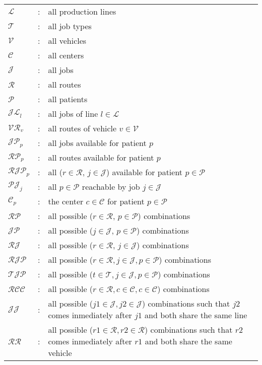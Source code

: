 \begin{tabular}{p{15mm}lp{105mm}}
    $\mathcal{L}$    & : & all production lines \\
    $\mathcal{T}$    & : & all job types \\                    
    $\mathcal{V}$    & : & all vehicles \\    
    $\mathcal{C}$    & : & all centers \\    
    $\mathcal{J}$    & : & all jobs \\    
    $\mathcal{R}$    & : & all routes \\    
    $\mathcal{P}$    & : & all patients \\
		$\mathcal{JL}_{l}$    & : & all jobs of line $l \in \mathcal{L}$ \\
		$\mathcal{VR}_{v}$    & : & all routes of vehicle $v \in \mathcal{V}$ \\
		$\mathcal{JP}_{p}$    & : & all jobs available for patient $p$ \\
		$\mathcal{RP}_p$    & : & all routes available for patient $p$ \\
		$\mathcal{RJP}_p$    & : & all ($r \in \mathcal{R}$, $j \in \mathcal{J}$) available for patient $p \in \mathcal{P}$ \\
		$\mathcal{PJ}_j$    & : & all $p \in \mathcal{P}$ reachable by job $j \in \mathcal{J}$ \\
		$\mathcal{C}_p$    & : & the center $c \in \mathcal{C}$ for patient $p \in \mathcal{P}$ \\
		$\mathcal{RP}$    & : & all possible ($r \in \mathcal{R}$, $p \in \mathcal{P}$) combinations \\
		$\mathcal{JP}$    & : & all possible ($j \in \mathcal{J}$, $p \in \mathcal{P}$) combinations \\
		$\mathcal{RJ}$    & : & all possible ($r \in \mathcal{R}$, $j \in \mathcal{J}$) combinations \\
		$\mathcal{RJP}$    & : & all possible ($r \in \mathcal{R},j \in \mathcal{J},p \in \mathcal{P}$) combinations \\
		$\mathcal{TJP}$    & : & all possible ($t \in \mathcal{T},j \in \mathcal{J},p \in \mathcal{P}$) combinations \\
		$\mathcal{RCC}$    & : & all possible ($r \in \mathcal{R}, c \in \mathcal{C}, c \in \mathcal{C}$) combinations \\
		$\mathcal{JJ}$    & : & all possible ($j1 \in \mathcal{J}, j2 \in \mathcal{J}$) combinations such that $j2$ comes inmediately after $j1$ and both share the same line \\
		$\mathcal{RR}$    & : & all possible ($r1 \in \mathcal{R}, r2 \in \mathcal{R}$) combinations such that $r2$ comes inmediately after $r1$ and both share the same vehicle \\
\end{tabular}
\bigskip

